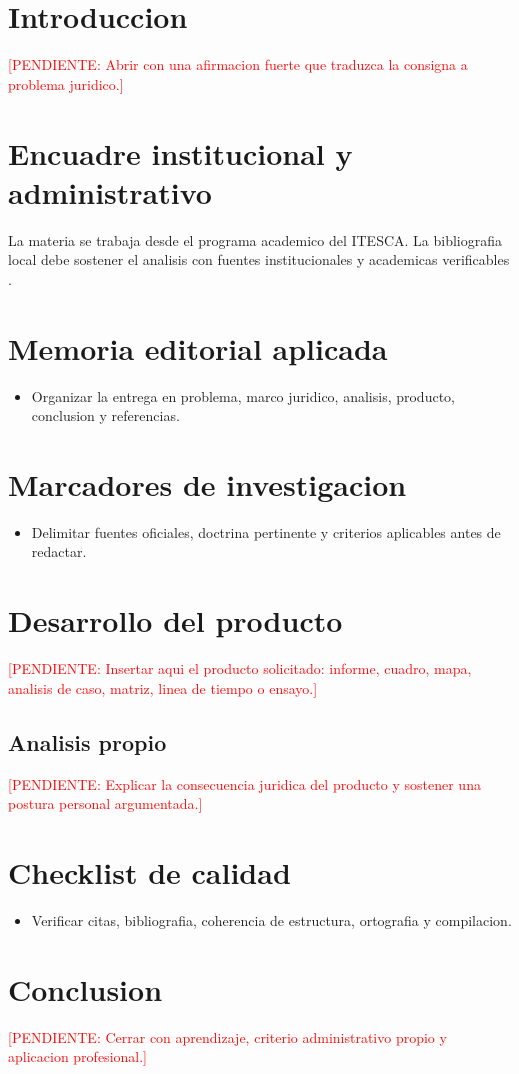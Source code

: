 \documentclass[12pt,letterpaper,oneside]{article}
\newcommand{\pendiente}[1]{\textcolor{red}{[PENDIENTE: #1]}}
\begin{document}
\section{Introduccion}
\pendiente{Abrir con una afirmacion fuerte que traduzca la consigna a problema juridico.}

\section{Encuadre institucional y administrativo}
La materia se trabaja desde el programa academico del ITESCA. La bibliografia
local debe sostener el analisis con fuentes institucionales y academicas
verificables \citep{itescaProgramaFundamentosGestion,robbinsCoulter2018Administracion}.

\section{Memoria editorial aplicada}
\begin{itemize}
  \item Organizar la entrega en problema, marco juridico, analisis, producto, conclusion y referencias.
\end{itemize}

\section{Marcadores de investigacion}
\begin{itemize}
  \item Delimitar fuentes oficiales, doctrina pertinente y criterios aplicables antes de redactar.
\end{itemize}

\section{Desarrollo del producto}
\pendiente{Insertar aqui el producto solicitado: informe, cuadro, mapa, analisis de caso, matriz, linea de tiempo o ensayo.}

\subsection{Analisis propio}
\pendiente{Explicar la consecuencia juridica del producto y sostener una postura personal argumentada.}

\section{Checklist de calidad}
\begin{itemize}
  \item Verificar citas, bibliografia, coherencia de estructura, ortografia y compilacion.
\end{itemize}

\section{Conclusion}
\pendiente{Cerrar con aprendizaje, criterio administrativo propio y aplicacion profesional.}

\clearpage
\nocite{itescaProgramaFundamentosGestion,robbinsCoulter2018Administracion}

\end{document}
